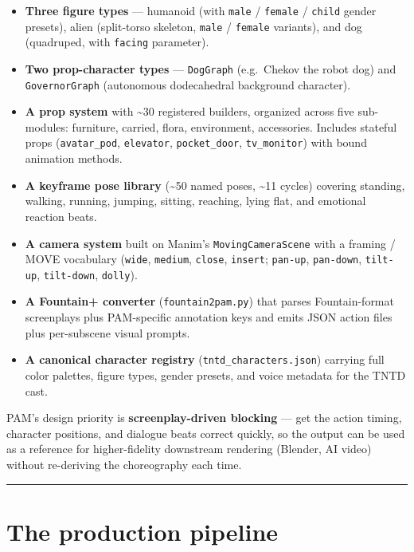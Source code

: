 \documentclass[
  11pt,
]{book}
\providecommand{\tightlist}{%
  \setlength{\itemsep}{0pt}\setlength{\parskip}{0pt}}
\begin{document}
\begin{itemize}
\tightlist
\item
  \textbf{Three figure types} --- humanoid (with \texttt{male} /
  \texttt{female} / \texttt{child} gender presets), alien (split-torso
  skeleton, \texttt{male} / \texttt{female} variants), and dog
  (quadruped, with \texttt{facing} parameter).
\item
  \textbf{Two prop-character types} --- \texttt{DogGraph} (e.g.~Chekov
  the robot dog) and \texttt{GovernorGraph} (autonomous dodecahedral
  background character).
\item
  \textbf{A prop system} with \textasciitilde30 registered builders,
  organized across five sub-modules: furniture, carried, flora,
  environment, accessories. Includes stateful props
  (\texttt{avatar\_pod}, \texttt{elevator}, \texttt{pocket\_door},
  \texttt{tv\_monitor}) with bound animation methods.
\item
  \textbf{A keyframe pose library} (\textasciitilde50 named poses,
  \textasciitilde11 cycles) covering standing, walking, running,
  jumping, sitting, reaching, lying flat, and emotional reaction beats.
\item
  \textbf{A camera system} built on Manim's \texttt{MovingCameraScene}
  with a framing / MOVE vocabulary (\texttt{wide}, \texttt{medium},
  \texttt{close}, \texttt{insert}; \texttt{pan-up}, \texttt{pan-down},
  \texttt{tilt-up}, \texttt{tilt-down}, \texttt{dolly}).
\item
  \textbf{A Fountain+ converter} (\texttt{fountain2pam.py}) that parses
  Fountain-format screenplays plus PAM-specific annotation keys and
  emits JSON action files plus per-subscene visual prompts.
\item
  \textbf{A canonical character registry}
  (\texttt{tntd\_characters.json}) carrying full color palettes, figure
  types, gender presets, and voice metadata for the TNTD cast.
\end{itemize}

PAM's design priority is \textbf{screenplay-driven blocking} --- get the
action timing, character positions, and dialogue beats correct quickly,
so the output can be used as a reference for higher-fidelity downstream
rendering (Blender, AI video) without re-deriving the choreography each
time.

\begin{center}\rule{0.5\linewidth}{0.5pt}\end{center}

\section{The production pipeline}\label{the-production-pipeline}
\end{document}
